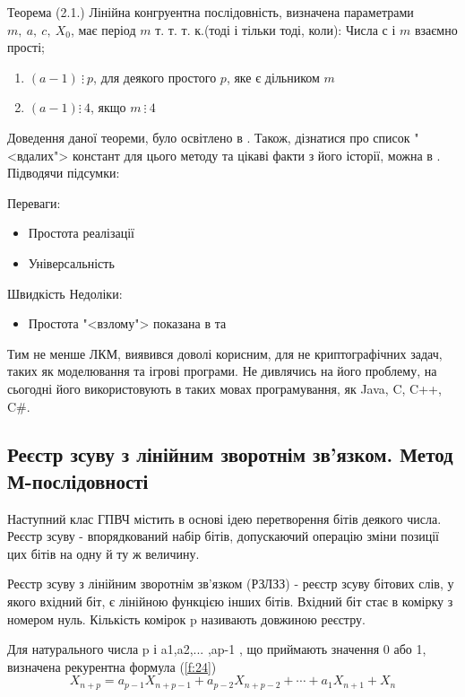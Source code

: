 \documentclass[oneside,final,14pt]{extreport}
\begin{document}
\begin{large}
Теорема (2.1.) Лінійна конгруентна послідовність, визначена 
параметрами $m,\:a,\: c,\: X_0$, має період $m$ т. т. т. к.(тоді і тільки тоді, коли):
Числа $с$ і $m$ взаємно прості;
\begin{enumerate}
	\item $(a - 1) \: \vdots \: p$, для деякого простого $p$, яке є дільником $m$
	\item $(a - 1) \vdots \: 4$, якщо $m\: \vdots \: 4$
\end{enumerate}

Доведення даної теореми, було освітлено в \cite{b3}.
	Також, дізнатися про список "<вдалих"> констант для цього 
	методу та цікаві факти з його історії, можна в \cite{b4}.
Підводячи підсумки:

Переваги:
\begin{itemize}
	\item Простота реалізації
	\item Універсальність 
\end{itemize}Швидкість
Недоліки:
\begin{itemize}
	\item Простота "<взлому"> показана в \cite{b5} та \cite{b6}
\end{itemize}

Тим не менше ЛКМ, виявився доволі корисним, для не криптографічних 
задач, таких як моделювання та ігрові програми. Не дивлячись на його
 проблему, на сьогодні його використовують в таких мовах програмування, як Java, C, C++, C\#.

\subsection{Реєстр зсуву з лінійним зворотнім зв'язком. Метод М-послідовності}\label{ss:232}
Наступний клас ГПВЧ містить в основі ідею перетворення бітів деякого числа.
Реєстр зсуву - впорядкований набір бітів, допускаючий операцію зміни позиції 
цих бітів на одну й ту ж величину. 

Реєстр зсуву з лінійним зворотнім зв'язком (РЗЛЗЗ) - реєстр зсуву бітових слів,
 у якого вхідний біт, є лінійною функцією інших бітів. Вхідний біт стає в комірку 
 з номером нуль. Кількість комірок p називають довжиною реєстру.

 Для натурального числа p і a1,a2,... ,ap-1 ,  що приймають значення 0 або 1, 
	визначена рекурентна формула (\ref{f:24})
	\begin{equation}
	X_{n+p} = a_{p-1}X_{n+p-1}+a_{p-2}X_{n+p-2}+ \cdots +a_{1}X_{n+1}+X_n
	\label{f:24}
	\end{equation}


\end{large}
\end{document}
